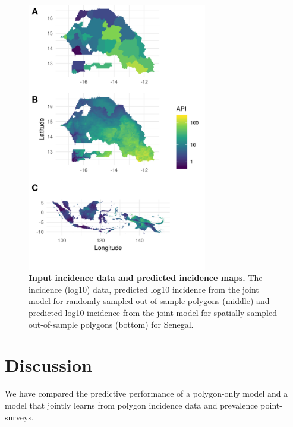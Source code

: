 \documentclass[10pt,letterpaper]{article}
\begin{document}
\begin{figure}
\includegraphics[width = 0.7\textwidth]{figures/sen_both_cv12_preds.png}
\caption{{\bf Input incidence data and predicted incidence maps. } 
The incidence (log10) data, predicted log10 incidence from the joint model for randomly sampled out-of-sample polygons (middle) and predicted log10 incidence from the joint model for spatially sampled out-of-sample polygons (bottom) for Senegal.
}
\label{predobsmapsen}
\end{figure}


\section*{Discussion}



We have compared the predictive performance of a polygon-only model and a model that jointly learns from polygon incidence data and prevalence point-surveys.

%
\end{document}

